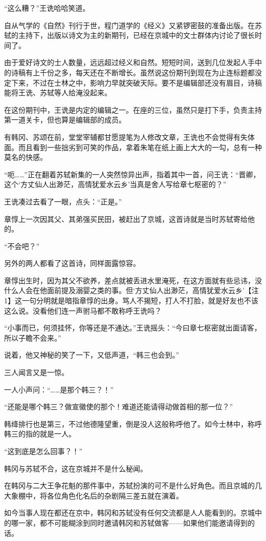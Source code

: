 “这么糟？”王诜哈哈笑道。

自从气学的《自然》刊行于世，程门道学的《经义》又紧锣密鼓的准备出版。在苏轼的主持下，出版以诗文为主的新期刊，已经在京城中的文士群体内讨论了很长时间了。

由于爱好诗文的士人数量，远远超过经义和自然。短短时间，送到几位发起人手中的诗稿有上千份之多，每天还在不断增长。虽然说这份期刊到现在为止连标题都没定下来，不过在士林之中，影响力早就突破天际。要不是编辑部还没有眉目，诗稿能将王诜、苏轼等人给淹没起来。

在这份期刊中，王诜是内定的编辑之一。在座的三位，虽然只是打下手，负责主持第一道关卡，但也算是编辑部的成员。

有韩冈、苏颂在前，堂堂宰辅都甘愿提笔为人修改文章，王诜也不会觉得有失体面。而且看到一些拙劣到可笑的作品，拿着朱笔在纸上画上大大的一勾，总有一种莫名的快感。

“呃……”正在翻着苏轼新集的一人突然惊异出声，指着其中一首，问王诜：“晋卿，这个‘方丈仙人出渺茫，高情犹爱水云乡’当真是舍人写给章七枢密的？”

王诜凑过去看了一眼，点头：“正是。”

章惇上一次因其父、其弟强买民田，被赶出了京城，这首诗就是当时苏轼寄给他的。

“不会吧？”

另外的两人都看了这首诗，同样面露惊容。

章惇出生时，因为其父不欲养，差点就被丢进水里淹死，在这方面就有些忌讳，没什么人会在他面前提及溺婴之类的事。但‘方丈仙人出渺茫，高情犹爱水云乡’【注1】这一句分明就是暗指章惇的出身。骂人不揭短，打人不打脸，就是好友也不该这么说。没看他们连一声驸马都不敢称呼王诜吗？

“小事而已，何须挂怀，你等还是不通达。”王诜摇头：“今曰章七枢密就出面请客，所以子瞻不会来。”

说着，他又神秘的笑了一下，又低声道，“韩三也会到。”

三人闻言又是一惊。

一人小声问：“……是那个韩三？！”

“还能是哪个韩三？做宣徽使的那个！难道还能请得动做首相的那一位？”

韩绛排行也是第三，不过他德隆望重，倒是没人这般称呼他了。如今士林中，称呼韩三的指的就是一人。

“这到底是怎么回事？！”

韩冈与苏轼不合，这在京城并不是什么秘闻。

在韩冈与二大王争花魁的那件事中，苏轼扮演的可不是什么好角色。而且京城的几大象棚中，将各位角色化名后的杂剧隔三差五就在演着。

如今当事人现在都还在京中，韩冈和苏轼没有任何交流都是人人能看到的。京城中的哪一家，都不可能糊涂到同时邀请韩冈和苏轼做客——如果他们能邀请得到的话。

